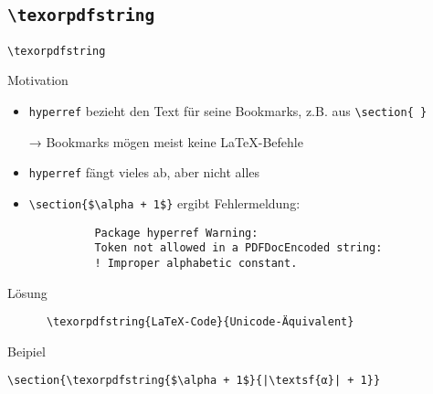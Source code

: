 \subsection{\texttt{\textbackslash texorpdfstring}}

\begin{frame}[fragile]{\texttt{\textbackslash texorpdfstring}}
  \begin{block}{Motivation}
    \begin{itemize}
      \item \texttt{hyperref} bezieht den Text für seine Bookmarks, z.B. aus \lstinline+\section{ }+
      \item[→] Bookmarks mögen meist keine \LaTeX-Befehle
      \item \texttt{hyperref} fängt vieles ab, aber nicht alles
      \item
        \lstinline!\section{$\alpha + 1$}! ergibt Fehlermeldung:
        \begin{lstlisting}
          Package hyperref Warning:
          Token not allowed in a PDFDocEncoded string:
          ! Improper alphabetic constant.
        \end{lstlisting}
    \end{itemize}
  \end{block}
  \begin{block}{Lösung}
    \begin{lstlisting}
      \texorpdfstring{LaTeX-Code}{Unicode-Äquivalent}
    \end{lstlisting}
  \end{block}
  \begin{block}{Beipiel}
    \begin{lstlisting}[escapechar=|]
      \section{\texorpdfstring{$\alpha + 1$}{|\textsf{α}| + 1}}
    \end{lstlisting}
  \end{block}
\end{frame}
